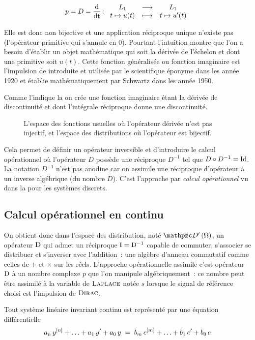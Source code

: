 \begin{equation}
  \label{eq:application_derivee}
  p=D=\frac{\mathrm{d{}}}{\mathrm{d{t}}} : \begin{array}{ccc} L_1 & \longrightarrow & L_1 \\ t\mapsto u(t) & \longmapsto & t\mapsto u'(t) \\ \end{array}
\end{equation}


Elle est donc non bijective et une application réciproque unique
n'existe pas (l'opérateur primitive qui s'annule en 0). Pourtant
l'intuition montre que l'on a besoin d'établir un objet mathématique
qui soit la dérivée de l'échelon et dont une primitive soit
$u(t)$. Cette fonction généralisée ou fonction imaginaire est
l'impulsion de \Dirac{} introduite et utilisée par le scientifique
éponyme dans les année 1920 et établie mathématiquement par Schwartz
dans les année 1950.

Comme l'indique la  on crée une
fonction imaginaire étant la dérivée de discontinuité et dont
l'intégrale réciproque donne une discontinuité.
\begin{figure}[ht!]
  \centering
  \caption{L'espace des fonctions usuelles où l'opérateur dérivée n'est pas injectif, et l'espace des distributions où l'opérateur est bijectif. }
  \label{fig:fonctions_et_distributions}
\end{figure}


Cela permet de définir un opérateur inversible et d'introduire le
calcul opérationnel où l'opérateur $D$ possède une réciproque $D^{-1}$
tel que $D\circ D^{-1}=\mathrm{Id}$. La notation $D^{-1}$ n'est pas anodine
car on assimile une réciproque d'opérateur à un inverse algébrique (du
nombre $D$). C'est l'approche par \emph{calcul opérationnel} vu dans
la  pour les systèmes discrets.

\subsection{Calcul opérationnel en continu}
On obtient donc dans l'espace des distribution, noté $\Dis$, un
opérateur $\mathrm{D}$ qui admet un réciproque $\mathrm{I}=\mathrm{D}^{-1}$ capable de
commuter, s'associer se distribuer et s'inverser avec l'addition~: une
algèbre d'anneau commutatif comme celles de $+$ et $\times$ sur les
réels. L'approche opérationnelle assimile c'est opérateur $\mathrm{D}$ à un
nombre complexe $p$ que l'on manipule algébriquement~: ce nombre peut
être assimilé à la variable de $\textsc{Laplace}$ notée $s$ lorsque le signal
de référence choisi est l'impulsion de $\textsc{Dirac}$.

Tout système linéaire invariant continu est représenté par une
équation différentielle
$$
a_n\,y^{\left[n\right]}+\ldots+a_1\,y'+a_0\,y \;=\; b_m\,e^{\left[m\right]} + \ldots +
b_1\,e' + b_0\,e
$$

